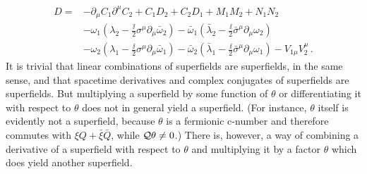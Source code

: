 \begin{equation}
  \begin{aligned}
  D={}&-\partial_\mu C_1\partial^\mu C_2+C_1D_2+C_2D_1
  +M_1M_2+N_1N_2\\
  &-\omega_1\left(\lambda_2
      -\frac{\ii}{2}\sigma^\mu\partial_\mu\bar\omega_2\right)
   -\bar\omega_1\left(\bar\lambda_2
      -\frac{\ii}{2}\bar\sigma^\mu\partial_\mu\omega_2\right)\\
  &-\omega_2\left(\lambda_1
      -\frac{\ii}{2}\sigma^\mu\partial_\mu\bar\omega_1\right)
   -\bar\omega_2\left(\bar\lambda_1
      -\frac{\ii}{2}\bar\sigma^\mu\partial_\mu\omega_1\right)
  -V_{1\mu}V_2^\mu\,.
  \end{aligned}
  \tag{26.2.25}\label{eq:26.2.25}
\end{equation}
It is trivial that linear combinations of superfields are superfields, in the
same sense, and that spacetime derivatives and complex conjugates of
superfields are superfields. But multiplying a superfield by some function of
$\theta$ or differentiating it with respect to $\theta$ does not in general
yield a superfield. (For instance, $\theta$ itself is evidently not a
superfield, because $\theta$ is a fermionic c-number and therefore commutes
with \(\xi Q+\bar\xi\bar Q\), while $\mathcal{Q}\theta\neq0$.) There is, however, a way of
combining a derivative of a superfield with respect to $\theta$ and
multiplying it by a factor $\theta$ which does yield another superfield.

